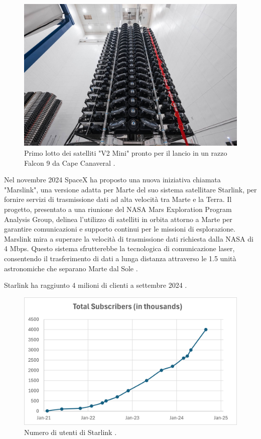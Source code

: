 \begin{figure}[htbp]
  \centering
  \includegraphics[width=0.8\linewidth]{./res/img/satellite_v2mini.jpg}
  \caption{Primo lotto dei satelliti "V2 Mini" pronto per il lancio in un razzo Falcon 9 da Cape Canaveral \cite{starlink_secon_nodate}.}
  \label{fig:satellite_v2mini}
\end{figure}

Nel novembre 2024 SpaceX ha proposto una nuova iniziativa chiamata "Marslink", una versione adatta per Marte del suo sistema satellitare Starlink, per fornire servizi di trasmissione dati ad alta velocità tra Marte e la Terra. 
Il progetto, presentato a una riunione del NASA Mars Exploration Program Analysis Group, delinea l'utilizzo di satelliti in orbita attorno a Marte per garantire comunicazioni e supporto continui per le missioni di esplorazione.
Marslink mira a superare la velocità di trasmissione dati richiesta dalla NASA di 4 Mbps.
Questo sistema sfrutterebbe la tecnologica di comunicazione laser, consentendo il trasferimento di dati a lunga distanza attraverso le 1.5 unità astronomiche che separano Marte dal Sole \cite{michael_kan_spacex_2024}.

Starlink ha raggiunto 4 milioni di clienti a settembre 2024 \cite{starlink_starlink_nodate}.

\begin{figure}[htbp]
  \centering
  \includegraphics[width=0.8\linewidth]{./res/img/chart_subs.png}
  \caption{Numero di utenti di Starlink \cite{starlink_starlink_nodate}.}
  \label{fig:chart-subs}
\end{figure}

